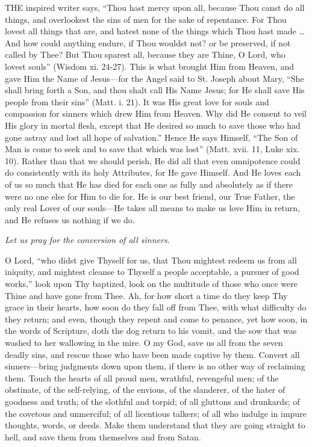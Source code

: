 
THE inspired writer
says, ``Thou hast mercy upon all, because Thou canst do all things, and
overlookest the sins of men for the sake of repentance. For Thou lovest
all things that are, and hatest none of the things which Thou hast made
… And how could anything endure, if Thou wouldst not? or be preserved,
if not called by Thee? But Thou sparest all, because they are Thine, O
Lord, who lovest souls'' (Wisdom xi. 24-27). This is what brought Him
from Heaven, and gave Him the Name of Jesus—for the Angel said to St.
Joseph about Mary, ``She shall bring forth a Son, and thou shalt call His
Name Jesus; for He shall save His people from their sins'' (Matt. i. 21).
It was His great love for souls and compassion for sinners which drew
Him from Heaven. Why did He consent to veil His glory in mortal flesh,
except that He desired so much to save those who had gone astray and
lost all hope of salvation.'' Hence He says Himself, ``The Son of Man is
come to seek and to save that which was lost'' (Matt. xvii. 11, Luke xix.
10). Rather than that we should perish, He did all that even omnipotence
could do consistently with its holy Attributes, for He gave Himself. And
He loves each of us so much that He has died for each one as fully and
absolutely as if there were no one else for Him to die for. He is
our best friend, our True Father, the only real Lover of our souls—He
takes all means to make us love Him in return, and He refuses us nothing
if we do.

\emph{Let us pray for the
conversion of all sinners}.

O Lord, ``who didst give Thyself
for us, that Thou mightest redeem us from all iniquity, and mightest
cleanse to Thyself a people acceptable, a pursuer of good works,'' look
upon Thy baptized, look on the multitude of those who once were Thine
and have gone from Thee. Ah, for how short a time do they keep Thy grace
in their hearts, how soon do they fall off from Thee, with what
difficulty do they return; and even, though they repent and come to
penance, yet how soon, in the words of Scripture, doth the dog return to
his vomit, and the sow that was washed to her wallowing in the mire. O
my God, save us all from the seven deadly sins, and rescue those who
have been made captive by them. Convert all sinners—bring judgments
down upon them, if there is no other way of reclaiming them. Touch the
hearts of all proud men, wrathful, revengeful men; of the obstinate, of
the self-relying, of the envious, of the slanderer, of the hater of
goodness and truth; of the slothful and torpid; of all gluttons and
drunkards; of the covetous and unmerciful; of all licentious talkers; of
all who indulge in impure thoughts, words, or deeds. Make them
understand that they are going straight to hell, and save them from
themselves and from Satan.

